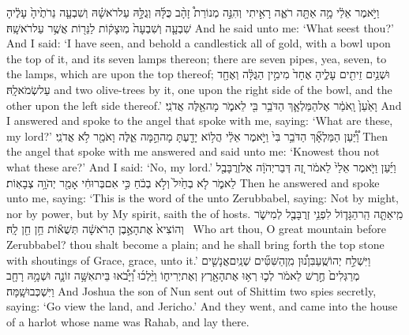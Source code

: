 {וַיֹּ֣אמֶר אֵלַ֔י מָ֥ה אַתָּ֖ה רֹאֶ֑ה  רָאִ֣יתִי \pasek  וְהִנֵּ֣ה מְנוֹרַת֩ זָהָ֨ב כֻּלָּ֜הּ וְגֻלָּ֣הּ עַל\maqqaf רֹאשָׁ֗הּ וְשִׁבְעָ֤ה נֵרֹתֶ֙יהָ֙ עָלֶ֔יהָ שִׁבְעָ֤ה וְשִׁבְעָה֙ מֽוּצָק֔וֹת לַנֵּר֖וֹת אֲשֶׁ֥ר עַל\maqqaf רֹאשָֽׁהּ׃}
{And he said unto me: ‘What seest thou?’ And I said: ‘I have seen, and behold a candlestick all of gold, with a bowl upon the top of it, and its seven lamps thereon; there are seven pipes, yea, seven, to the lamps, which are upon the top thereof;}
{וּשְׁנַ֥יִם זֵיתִ֖ים עָלֶ֑יהָ אֶחָד֙ מִימִ֣ין הַגֻּלָּ֔ה וְאֶחָ֖ד עַל\maqqaf שְׂמֹאלָֽהּ׃}
{and two olive-trees by it, one upon the right side of the bowl, and the other upon the left side thereof.’}
{וָאַ֙עַן֙ וָֽאֹמַ֔ר אֶל\maqqaf הַמַּלְאָ֛ךְ הַדֹּבֵ֥ר בִּ֖י לֵאמֹ֑ר מָה\maqqaf אֵ֖לֶּה אֲדֹנִֽי׃}
{And I answered and spoke to the angel that spoke with me, saying: ‘What are these, my lord?’}
{וַ֠יַּ֠עַן הַמַּלְאָ֞ךְ הַדֹּבֵ֥ר בִּי֙ וַיֹּ֣אמֶר אֵלַ֔י הֲל֥וֹא יָדַ֖עְתָּ מָה\maqqaf הֵ֣מָּה אֵ֑לֶּה וָאֹמַ֖ר לֹ֥א אֲדֹנִֽי׃}
{Then the angel that spoke with me answered and said unto me: ‘Knowest thou not what these are?’ And I said: ‘No, my lord.’}
{וַיַּ֜עַן וַיֹּ֤אמֶר אֵלַי֙ לֵאמֹ֔ר זֶ֚ה דְּבַר\maqqaf יְהֹוָ֔ה אֶל\maqqaf זְרֻבָּבֶ֖ל לֵאמֹ֑ר לֹ֤א בְחַ֙יִל֙ וְלֹ֣א בְכֹ֔חַ כִּ֣י אִם\maqqaf בְּרוּחִ֔י אָמַ֖ר יְהֹוָ֥ה צְבָאֽוֹת׃}
{Then he answered and spoke unto me, saying: ‘This is the word of the \lord\space unto Zerubbabel, saying: Not by might, nor by power, but by My spirit, saith the \lord\space of hosts.}
{מִֽי\maqqaf אַתָּ֧ה הַֽר\maqqaf הַגָּד֛וֹל לִפְנֵ֥י זְרֻבָּבֶ֖ל לְמִישֹׁ֑ר וְהוֹצִיא֙ אֶת\maqqaf הָאֶ֣בֶן הָרֹאשָׁ֔ה תְּשֻׁא֕וֹת חֵ֥ן חֵ֖ן לָֽהּ׃ \petucha }
{Who art thou, O great mountain before Zerubbabel? thou shalt become a plain; and he shall bring forth the top stone with shoutings of Grace, grace, unto it.’}
\newperek
{}
\label{haft_37}
\setcounter{chap}{2}
\setcounter{verse}{1}
{וַיִּשְׁלַ֣ח יְהוֹשֻֽׁעַ\maqqaf בִּן\maqqaf נ֠וּן מִֽן\maqqaf הַשִּׁטִּ֞ים שְׁנַֽיִם\maqqaf אֲנָשִׁ֤ים מְרַגְּלִים֙ חֶ֣רֶשׁ לֵאמֹ֔ר לְכ֛וּ רְא֥וּ אֶת\maqqaf הָאָ֖רֶץ וְאֶת\maqqaf יְרִיח֑וֹ וַיֵּ֨לְכ֜וּ וַ֠יָּבֹ֠אוּ בֵּית\maqqaf אִשָּׁ֥ה זוֹנָ֛ה וּשְׁמָ֥הּ רָחָ֖ב וַיִּשְׁכְּבוּ\maqqaf שָֽׁמָּה׃}
{And Joshua the son of Nun sent out of Shittim two spies secretly, saying: ‘Go view the land, and Jericho.’ And they went, and came into the house of a harlot whose name was Rahab, and lay there.}
